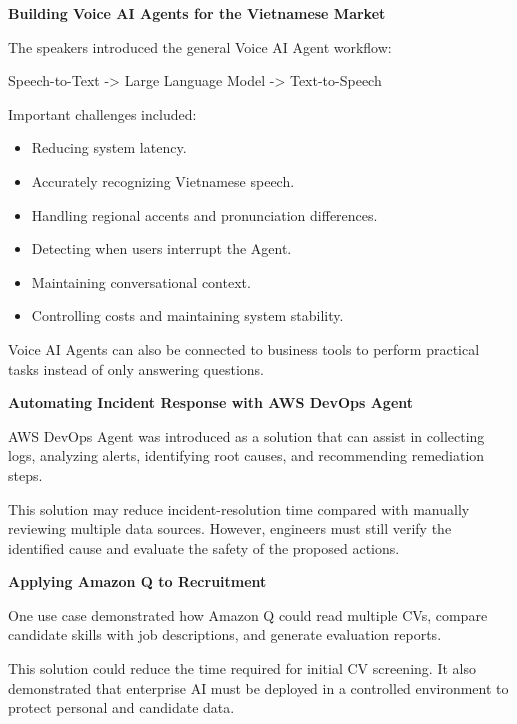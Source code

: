 \vspace{0.5em}\noindent\textbf{Building Voice AI Agents for the Vietnamese
Market}\par

The speakers introduced the general Voice AI Agent workflow:

Speech-to-Text -\textgreater{} Large Language Model -\textgreater{}
Text-to-Speech

Important challenges included:

\begin{itemize}
\tightlist
\item
  Reducing system latency.
\item
  Accurately recognizing Vietnamese speech.
\item
  Handling regional accents and pronunciation differences.
\item
  Detecting when users interrupt the Agent.
\item
  Maintaining conversational context.
\item
  Controlling costs and maintaining system stability.
\end{itemize}

Voice AI Agents can also be connected to business tools to perform
practical tasks instead of only answering questions.

\vspace{0.5em}\noindent\textbf{Automating Incident Response with AWS DevOps
Agent}\par

AWS DevOps Agent was introduced as a solution that can assist in
collecting logs, analyzing alerts, identifying root causes, and
recommending remediation steps.

This solution may reduce incident-resolution time compared with manually
reviewing multiple data sources. However, engineers must still verify
the identified cause and evaluate the safety of the proposed actions.

\vspace{0.5em}\noindent\textbf{Applying Amazon Q to
Recruitment}\par

One use case demonstrated how Amazon Q could read multiple CVs, compare
candidate skills with job descriptions, and generate evaluation reports.

This solution could reduce the time required for initial CV screening.
It also demonstrated that enterprise AI must be deployed in a controlled
environment to protect personal and candidate data.

